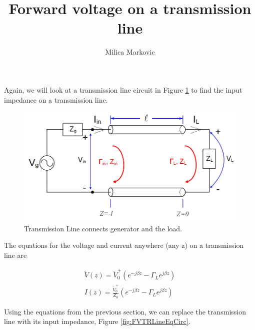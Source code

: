 \documentclass{ximera}
\title{Forward voltage on a transmission line}
\author{Milica Markovic}
\begin{document}
  
\begin{abstract}  

\end{abstract}  
\maketitle    



Again, we will look at a transmission line circuit in Figure \ref{fig:FVTRLine} to find the input impedance on a transmission line.





\begin{figure}[htbp]
\begin{center}
\includegraphics[scale=0.3]{../jpg/trline.jpg}
\end{center}
\caption{Transmission Line connects generator and the load.}
\label{fig:FVTRLine}
\end{figure}





The equations for the voltage and current anywhere (any z) on a transmission line  are


\begin{eqnarray}
\tilde{V}(z)= \tilde{V}_0^+ (e^{-j \beta z} - \Gamma_L  e^{j \beta z }  ) \label{eq:FVvtlfin} \\
I(z)=   \frac{\tilde{V}_0^+}{Z_0}  (e^{-j \beta z} - \Gamma_L  e^{j \beta z}  ) \label{eq:FVitlfin}
\end{eqnarray}


Using the equations from the previous section, we can replace the transmission line with its input impedance, Figure \ref{fig:FVTRLineEqCirc}.
\end{document}
